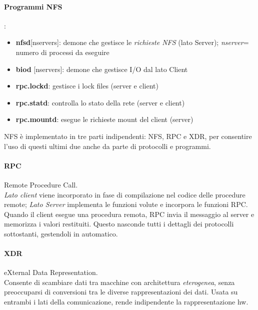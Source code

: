 \documentclass[a4paper,11pt]{article}
\begin{document}
\paragraph{Programmi NFS}:
\begin{itemize}
\item\textbf{nfsd}[nservers]: demone che gestisce le \textit{richieste NFS} (lato Server); \textit{nserver}= numero di processi da eseguire
\item\textbf{biod} [nservers]: demone che gestisce I/O dal lato Client
\item\textbf{rpc.lockd}: gestisce i lock files (server e client)
\item\textbf{rpc.statd}: controlla lo stato della rete (server e client)
\item\textbf{rpc.mountd}: esegue le richieste mount del client (server)
\end{itemize}
NFS è implementato in tre parti indipendenti: NFS, RPC e XDR, per consentire l'uso di questi ultimi due anche da parte di protocolli e programmi.
\paragraph{RPC} Remote Procedure Call.\\
\textit{Lato client} viene incorporato in fase di compilazione nel codice delle procedure remote; \textit{Lato Server} implementa le funzioni volute e incorpora le funzioni RPC.\\
Quando il client esegue una procedura remota, RPC invia il messaggio al server e memorizza i valori restituiti. Questo nasconde tutti i dettagli dei protocolli sottostanti, gestendoli in automatico.
\paragraph{XDR} eXternal Data Representation.\\
Consente di scambiare dati tra macchine con architettura \textit{eterogenea}, senza preoccuparsi di conversioni tra le diverse rappresentazioni dei dati. Usata su entrambi i lati della comunicazione, rende indipendente la rappresentazione hw.
\newpage
\end{document}
